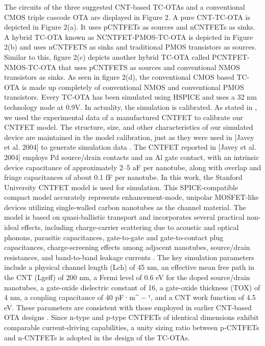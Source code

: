 The circuits of the three suggested CNT-based TC-OTAs and a conventional CMOS
triple cascode OTA are displayed in Figure 2. A pure CNT-TC-OTA is depicted in
Figure 2(a). It uses pCNTFETs as sources and nCNTFETs as sinks. A hybrid TC-OTA
known as NCNTFET-PMOS-TC-OTA is depicted in Figure 2(b) and uses nCNTFETS as
sinks and traditional PMOS transistors as sources. Similar to this, figure 2(c)
depicts another hybrid TC-OTA called PCNTFET-NMOS-TC-OTA that uses pCNTFETS as
sources and conventional NMOS transistors as sinks. As seen in figure 2(d), the
conventional CMOS based TC-OTA is made up completely of conventional NMOS and
conventional PMOS transistors. Every TC-OTA has been simulated using HSPICE and
uses a 32 nm technology node at 0.9V. In actuality, the simulation is
calibrated. As stated in \cite{ref16}, we used the experimental data of a
manufactured CNTFET to calibrate our CNTFET model. The structure, size, and
other characteristics of our simulated device are maintained in the model
calibration, just as they were used in [Javey et al. 2004] to generate
simulation data \cite{ref16}. The CNTFET reported in [Javey et al. 2004] employs
Pd source/drain contacts and an Al gate contact, with an intrinsic device
capacitance of approximately 2–5 aF per nanotube, along with overlap and fringe
capacitances of about 0.1 fF per nanotube. In this work, the Stanford University
CNTFET model is used for simulation. This SPICE-compatible compact model
accurately represents enhancement-mode, unipolar MOSFET-like devices utilizing
single-walled carbon nanotubes as the channel material. The model is based on
quasi-ballistic transport and incorporates several practical non-ideal effects,
including charge-carrier scattering due to acoustic and optical phonons,
parasitic capacitances, gate-to-gate and gate-to-contact plug capacitances,
charge-screening effects among adjacent nanotubes, source/drain resistances, and
band-to-band leakage currents \cite{ref7,ref16,ref26}.
The key simulation parameters include a physical channel length (Lch) of 45 nm,
an effective mean free path in the CNT (Lgeff) of 200 nm, a Fermi level of 0.6
eV for the doped source/drain nanotubes, a gate-oxide dielectric constant of 16,
a gate-oxide thickness (TOX) of 4 nm, a coupling capacitance of 40 pF·m$\^{-}$¹,
and a CNT work function of 4.5 eV. These parameters are consistent with those
employed in earlier CNT-based OTA designs \cite{ref7,ref15}. Since n-type and
p-type CNTFETs of identical dimensions exhibit comparable current-driving
capabilities, a unity sizing ratio between p-CNTFETs and n-CNTFETs is adopted in
the design of the TC-OTAs.

